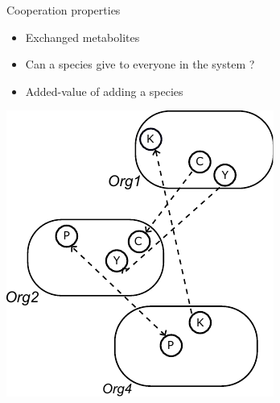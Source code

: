 \documentclass[8pt,usenames,dvipsnames]{beamer}
\begin{document}
\begin{frame}
{\begin{minipage}{0.4\textwidth}
\begin{block}{Cooperation properties}
\begin{itemize}
\item Exchanged metabolites
\item Can a species give to everyone in the system ?
\item Added-value of adding a species
\end{itemize}
\end{block}
\end{minipage}%
\hspace{0.5cm}
\hfill
\begin{minipage}{0.45\textwidth}
\includegraphics[width=\textwidth]{figures/properties-4.pdf}
\end{minipage}


}


\end{frame}
\end{document}
